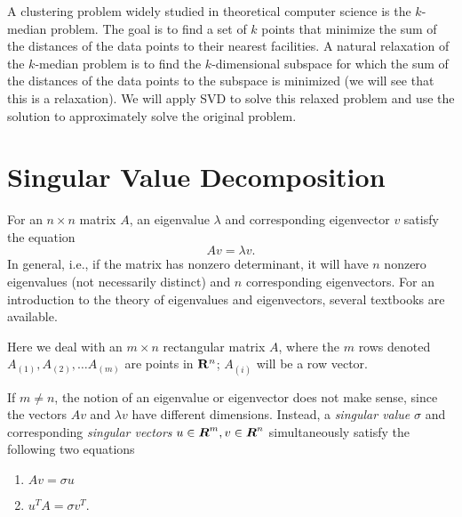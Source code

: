 \documentclass{book}
\numberwithin{exercise}{chapter}
\begin{document}
A clustering problem
widely studied in theoretical computer science is the $k$-median problem. The goal is to find a set of $k$ points
that minimize the sum of the distances of the data points to their nearest facilities.
A natural relaxation of the $k$-median problem is to find the
$k$-dimensional subspace for which the sum of the distances
of the data points to the subspace is minimized (we will see that this is a relaxation).
We will apply SVD to solve this relaxed problem and use the solution to approximately solve the original problem.


\section{Singular Value Decomposition}

For an $n \times n$ matrix $A$, an eigenvalue $\lambda$ and corresponding
eigenvector $v$ satisfy the equation
\[
Av = \lambda v.
\]
In general, i.e., if the matrix has nonzero determinant, it will have
$n$ nonzero eigenvalues (not necessarily distinct) and $n$ corresponding eigenvectors. For an introduction to the theory of eigenvalues and eigenvectors, several textbooks are available.  

Here we deal with an $m \times n$ rectangular matrix $A$, where the $m$ rows
denoted $A_{(1)},A_{(2)},\ldots A_{(m)}$ are
points in ${\bf R}^n$; $A_{(i)}$ will be a row vector.

If $m\neq n$,
the notion of an eigenvalue or eigenvector does not make
sense, since the vectors $Av$ and $\lambda v$ have different dimensions.
Instead, a \emph{singular value} $\sigma$ and
corresponding \emph{singular vectors} $u \in \mbox{\mbox{\boldmath $R$}}^m, v \in \mbox{\mbox{\boldmath $R$}}^n$
simultaneously satisfy the following two equations
\begin{enumerate}
\item $Av = \sigma u$
\item $u^TA = \sigma v^T$.
\end{enumerate}

\end{document}
